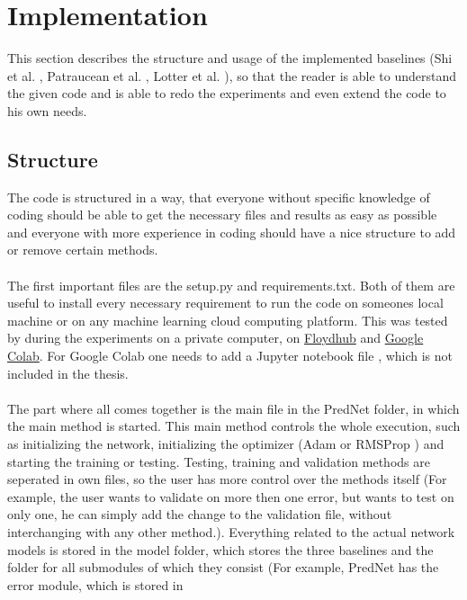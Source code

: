 \section{Implementation} \label{section::implementation}
 This section describes the structure and usage of the implemented baselines (Shi et al. \cite{Shi2015}, Patraucean et al. \cite{Patraucean2015},
 Lotter et al. \cite{Lotter2016}), so that the reader is able to understand the given code and is able to redo the experiments and even extend the code to
 his own needs.
  
 \subsection{Structure} \label{subsection::structure}
  The code is structured in a way, that everyone without specific knowledge of coding should be able to get the necessary files and results as easy as possible and
  everyone with more experience in coding should have a nice structure to add or remove certain methods.
  \\\\
  The first important files are the setup.py and requirements.txt. Both of them are useful to install every necessary requirement to run the code on someones 
  local machine or on any machine learning cloud computing platform. This was tested by during the experiments on a private computer, on 
  \href{www.floydhub.com} {Floydhub} and \href{colab.research.google.com}{Google Colab}.
  For Google Colab one needs to add a Jupyter notebook file \cite{Kluyver2016}, which is not included in the thesis.
  \\\\
  The part where all comes together is the main file in the PredNet folder, in which the main method is started. This main method controls the whole
  execution, such as initializing the network,
  initializing the optimizer (Adam \cite{Kingma2015} or RMSProp \cite{Ruder2016}) and starting the training or testing. Testing, training and validation methods 
  are seperated in own files, so the user has more 
  control over the methods itself (For example, the user wants to validate on more then one error, but wants to test on only one, he can simply
  add the change to the validation file, without interchanging with any other method.). Everything related to the actual network models is stored in the model 
  folder, which stores the three baselines and the folder for all submodules of which they consist (For example, PredNet has the error module, which is stored in 
